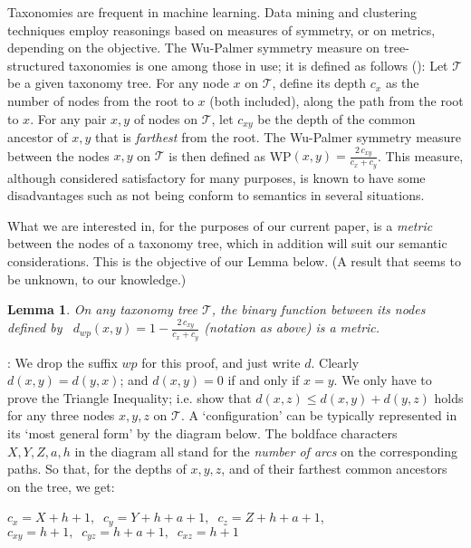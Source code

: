 \documentclass[pdflatex]{article}
\def \T {{\mathcal{T}}}
\newtheorem{lemma}{Lemma}
\def \lft {\noindent}
\newcommand{\disp}[1]{\vspace*{-1em}
    \begin{center} {#1} \end{center} \vspace*{-1mm} }
\begin{document}
  Taxonomies are frequent in machine learning.  Data mining  and clustering  techniques
  employ reasonings based on measures of symmetry, or on metrics, depending  on the
  objective. The Wu-Palmer symmetry  measure on tree-structured   taxonomies is
  one among those in use; it is defined as follows (\cite{WuPalm1994}):
  Let $\T$ be a  given  taxonomy tree.   For any node $x$ on $\T$, define its depth
  $c_x$ as the number of nodes  from the root  to $x$ (both included), along the path
  from the root to $x$. For any pair $x, y$ of nodes  on $\T$, let $c_{x y}$ be the depth
  of the common ancestor of $x, y$ that is  {\em farthest } from the root.
  The Wu-Palmer symmetry  measure between the nodes  $x, y$  on $\T$ is then
  defined as WP$(x, y) = \frac{2 \, c_{x y}}{c_x + c_y}$.
  This measure, although considered satisfactory for many purposes, is known to have
  some disadvantages such as not being conform to semantics in several situations.

  What we are interested in, for the purposes of our current paper, is a   {\em metric}
  between the nodes of a taxonomy tree, which in addition will suit our semantic
  considerations.  This is the objective of our Lemma below. (A result that seems to be
  unknown, to our knowledge.) 

  \begin{lemma} %
    On any taxonomy tree $\T$, the  binary function between its
    nodes defined by \,  $d_{wp}(x, y) = 1 - \frac{2 \, c_{x y}}{c_x + c_y}$ {\em (notation
    as above)} is a metric. 
  \end{lemma}

  \vspace*{-1mm}
   \lft {\em Proof}:
We drop the suffix $wp$ for this proof, and just write $d$.
  Clearly $d(x, y) = d(y, x)$; and $d(x, y) = 0$ if and only if $x = y$.  We only have to
  prove the  Triangle Inequality; i.e. show that   $d(x,z) \le d(x, y) + d(y,z)$ holds for
  any three nodes $x,y,z$ on $\T$.  A `configuration'  can be  typically represented
  in its `most  general form'  by the  diagram below.
  The boldface characters   $X, Y, Z, a, h$ in the diagram all stand   for the  {\em
    number of arcs}  on the corresponding paths.  So that, for the depths  of $x, y, z$,
  and  of their farthest common  ancestors on the tree, we get:
  
  \disp{$c_x = X + h + 1 ,  \; \; c_y = Y + h + a + 1,  \;\;  c_z = Z + h + a + 1$, \\ 
     $c_{xy} = h + 1, \;\;   c_{yz} = h + a + 1,  \;\;  c_{xz} = h + 1$}
\end{document}

